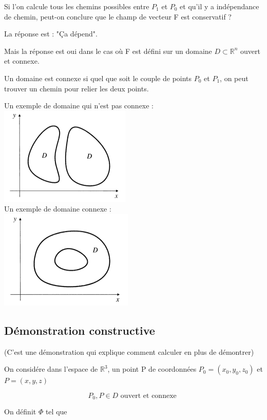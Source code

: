 Si l'on calcule tous les chemins possibles entre $P_1$ et $P_0$ et qu'il y a indépendance de chemin, peut-on conclure que le champ de vecteur F est conservatif ?

La réponse est : "\c Ca dépend".

Mais la réponse est oui dans le cas où F est défini sur un domaine $D\subset \mathbb{R}^n$ ouvert et connexe.
\begin{mydef}

Un domaine est connexe si quel que soit le couple de points $P_0$ et $P_1$, on peut trouver un chemin pour relier les deux points.
\end{mydef}


Un exemple de domaine qui n'est pas connexe : \\
\includegraphics[scale=1]{image1.png}
\\
Un exemple de domaine connexe :
\\
\includegraphics[scale=1]{image2.png}

\subsection{Démonstration constructive}

(C'est une démonstration qui explique comment calculer en plus de démontrer)

On considére dans l'espace de $\mathbb{R}^3$, un point P de coordonnées $P_0 = (x_0,y_0,z_0) $  et $P = (x,y,z)$

\[P_0, P \in D \text{ ouvert et connexe }\]

On définit $\Phi$ tel que

